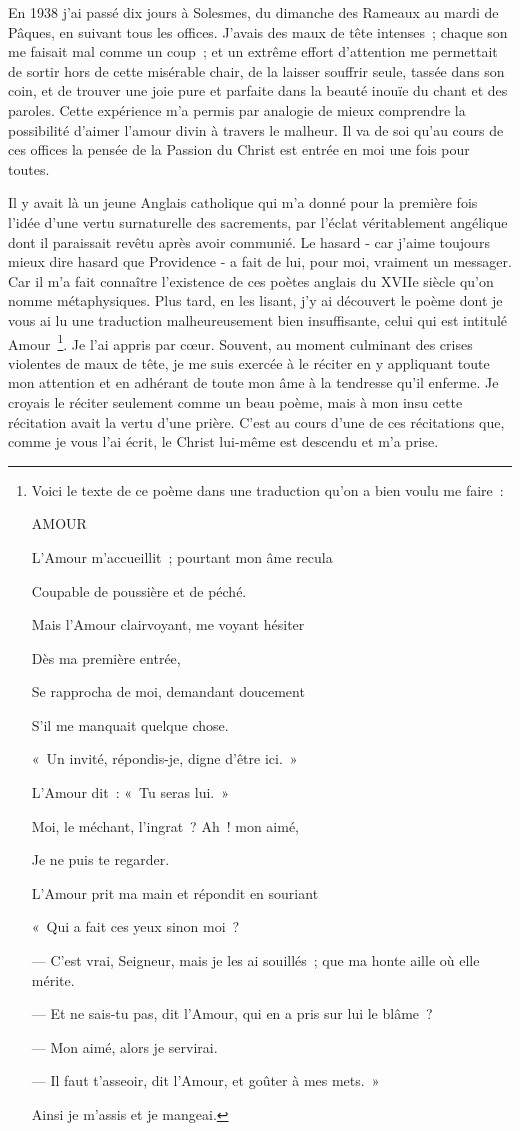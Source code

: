 \documentclass[french,twoside]{book} %
\begin{document}
En 1938 j'ai passé dix jours à Solesmes, du dimanche des Rameaux au mardi de Pâques, en suivant tous les offices. J'avais des maux de tête intenses ; chaque son me faisait mal comme un coup ; et un extrême effort d'attention me permettait de sortir hors de cette misérable chair, de la laisser souffrir seule, tassée dans son coin, et de trouver une joie pure et parfaite dans la beauté inouïe du chant et des paroles. Cette expérience m'a permis par analogie de mieux comprendre la possibilité d'aimer l'amour divin à travers le malheur. Il va de soi qu'au cours de ces offices la pensée de la Passion du Christ est entrée en moi une fois pour toutes.\par
Il y avait là un jeune Anglais catholique qui m'a donné pour la première fois l'idée d'une vertu surnaturelle des sacrements, par l'éclat véritablement angélique dont il paraissait revêtu après avoir communié. Le hasard - car j'aime toujours mieux dire hasard que Providence - a fait de lui, pour moi, vraiment un messager. Car il m'a fait connaître l'existence de ces poètes anglais du XVIIe siècle qu'on nomme métaphysiques. Plus tard, en les lisant, j'y ai découvert le poème dont je vous ai lu une traduction malheureusement bien insuffisante, celui qui est intitulé Amour \footnote{\noindent Voici le texte de ce poème dans une traduction qu'on a bien voulu me faire :\par
AMOUR\par
L'Amour m'accueillit ; pourtant mon âme recula\par
Coupable de poussière et de péché.\par
Mais l'Amour clairvoyant, me voyant hésiter\par
Dès ma première entrée,\par
Se rapprocha de moi, demandant doucement\par
S'il me manquait quelque chose.\par
« Un invité, répondis-je, digne d'être ici. »\par
L'Amour dit : « Tu seras lui. »\par
Moi, le méchant, l'ingrat ? Ah ! mon aimé,\par
Je ne puis te regarder.\par
L'Amour prit ma main et répondit en souriant\par
« Qui a fait ces yeux sinon moi ?\par
— C'est vrai, Seigneur, mais je les ai souillés ; que ma honte aille où elle mérite.\par
— Et ne sais-tu pas, dit l'Amour, qui en a pris sur lui le blâme ?\par
— Mon aimé, alors je servirai.\par
— Il faut t'asseoir, dit l'Amour, et goûter à mes mets. »\par
Ainsi je m'assis et je mangeai.
}. Je l'ai appris par cœur. Souvent, au moment culminant des crises violentes de maux de tête, je me suis exercée à le réciter en y appliquant toute mon attention et en adhérant de toute mon âme à la tendresse qu'il enferme. Je croyais le réciter seulement comme un beau poème, mais à mon insu cette récitation avait la vertu d'une prière. C'est au cours d'une de ces récitations que, comme je vous l'ai écrit, le Christ lui-même est descendu et m'a prise.\par
\end{document}
